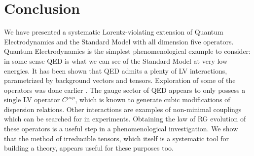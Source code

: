 \documentclass[12pt,preprintnumbers,nofootinbib]{revtex4}
\begin{document}
\section{Conclusion}
	We have presented a systematic Lorentz-violating extension of 
	Quantum Electrodynamics and the Standard Model 
	with all dimension five operators.
	Quantum Electrodynamics is the simplest phenomenological example
	to consider:
	in some sense QED is what we can see of the Standard Model at very 
	low energies. 
	It has been shown that QED admits a plenty of LV interactions,
	parametrized by background vectors and tensors.
	Exploration of some of the operators was done earlier
\cite{MP:,Gagnon:2004xh}.
	The gauge sector of QED appears to only possess a single LV
	operator $ C^{\mu\nu\rho} $, which is known to generate cubic
	modifications of dispersion relations.	
	Other interactions are examples of non-minimal couplings which can
	be searched for in experiments.
	Obtaining the law of RG evolution of these operators is a useful step in a 
	phenomenological investigation.
	We show that the method of irreducible tensors, which itself is a systematic
	tool for building a theory, appears useful for these purposes too.
\end{document}
